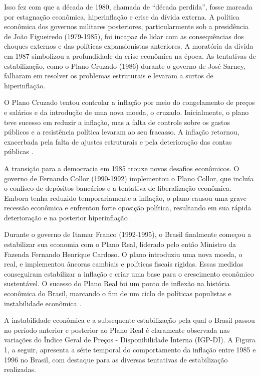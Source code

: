 \documentclass[12pt,oneside,a4paper,chapter=TITLE,english,brazil,sumario=abnt-6027-2012]{abntex2}
\begin{document}
Isso fez com que a década de 1980, chamada de ``década perdida'', fosse marcada por estagnação econômica, hiperinflação e crise da dívida externa. A política econômica dos governos militares posteriores, particularmente sob a presidência de João Figueiredo (1979-1985), foi incapaz de lidar com as consequências dos choques externos e das políticas expansionistas anteriores. A moratória da dívida em 1987 simbolizou a profundidade da crise econômica \cite{fabiogiambiagi_2016_economia} na época. As tentativas de estabilização, como o Plano Cruzado (1986) durante o governo de José Sarney, falharam em resolver os problemas estruturais e levaram a surtos de hiperinflação.

O Plano Cruzado tentou controlar a inflação por meio do congelamento de preços e salários e da introdução de uma nova moeda, o cruzado. Inicialmente, o plano teve sucesso em reduzir a inflação, mas a falta de controle sobre os gastos públicos e a resistência política levaram ao seu fracasso. A inflação retornou, exacerbada pela falta de ajustes estruturais e pela deterioração das contas públicas \cite{fabiogiambiagi_1999_a}.

A transição para a democracia em 1985 trouxe novos desafios econômicos. O governo de Fernando Collor (1990-1992) implementou o Plano Collor, que incluía o confisco de depósitos bancários e a tentativa de liberalização econômica. Embora tenha reduzido temporariamente a inflação, o plano causou uma grave recessão econômica e enfrentou forte oposição política, resultando em sua rápida deterioração e na posterior hiperinflação \cite{lacerda_2010_economia}.

Durante o governo de Itamar Franco (1992-1995), o Brasil finalmente começou a estabilizar sua economia com o Plano Real, liderado pelo então Ministro da Fazenda Fernando Henrique Cardoso. O plano introduziu uma nova moeda, o real, e implementou âncoras cambiais e políticas fiscais rígidas. Essas medidas conseguiram estabilizar a inflação e criar uma base para o crescimento econômico sustentável. O sucesso do Plano Real foi um ponto de inflexão na história econômica do Brasil, marcando o fim de um ciclo de políticas populistas e instabilidade econômica \cite{lacerda_2010_economia}.

A instabilidade econômica e a subsequente estabilização pela qual o Brasil passou no período anterior e posterior ao Plano Real é claramente observada nas variações do Índice Geral de Preços - Disponibilidade Interna (IGP-DI). A Figura 1, a seguir, apresenta a série temporal do comportamento da inflação entre 1985 e 1996 no Brasil, com destaque para as diversas tentativas de estabilização realizadas.
\end{document}
